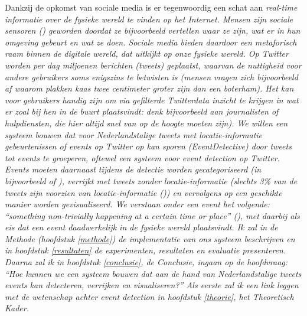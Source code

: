 Dankzij de opkomst van sociale media is er tegenwoordig een schat aan 
\it{real-time} informatie 
over de fysieke wereld te vinden op het Internet. Mensen zijn \it{sociale 
sensoren} (\citealt{sakaki2010earthquake}) geworden doordat ze bijvoorbeeld 
vertellen waar ze zijn, wat er in hun omgeving gebeurt en wat ze doen. Sociale 
media bieden daardoor een metaforisch raam binnen
de digitale wereld, dat uitkijkt op onze fysieke wereld.
\vl
Op \it{Twitter} worden per dag miljoenen berichten (\it{tweets}) geplaatst, 
waarvan de nuttigheid voor andere gebruikers soms enigszins te
betwisten is (mensen vragen zich bijvoorbeeld af waarom plakken kaas twee 
centimeter groter zijn dan een boterham).
Het kan voor gebruikers handig zijn om via gefilterde Twitterdata inzicht te 
krijgen in wat er zoal bij hen in de buurt plaatsvindt: denk 
bijvoorbeeld aan journalisten of hulpdiensten, die hier altijd snel van op de 
hoogte moeten zijn). We willen een systeem bouwen dat 
voor Nederlandstalige tweets met locatie-informatie gebeurtenissen of \it{events} op Twitter op kan sporen (Event\it{Detective}) door tweets 
tot events te groeperen, oftewel 
een systeem voor \it{event detection} op Twitter. Events moeten daarnaast
tijdens de detectie worden gecategoriseerd (in bijvoorbeeld  of ), verrijkt met tweets zonder locatie-informatie (slechts 3\% van de 
tweets zijn voorzien van locatie-informatie (\citealt{leetaru2013mapping})) en vervolgens op een geschikte manier 
worden gevisualiseerd. We verstaan onder een event het
volgende: \it{``something non-trivially happening at a certain time or place''} 
(\citealt{yang1998study}), met daarbij als eis 
dat een event daadwerkelijk in de fysieke wereld plaatsvindt.
\vl
Ik zal in de Methode (hoofdstuk \ref{methode}) de implementatie van ons systeem 
beschrijven en in hoofdstuk \ref{resultaten} de experimenten, resultaten en evaluatie
presenteren. Daarna zal ik in hoofdstuk \ref{conclusie}, de Conclusie, ingaan op de 
hoofdvraag: \it{``Hoe kunnen we een systeem bouwen dat aan de hand van
Nederlandstalige tweets events kan detecteren, verrijken en visualiseren?''} Als 
eerste zal ik een link leggen met de wetenschap achter 
event detection in hoofdstuk \ref{theorie}, het Theoretisch Kader.

\label{theorie}

